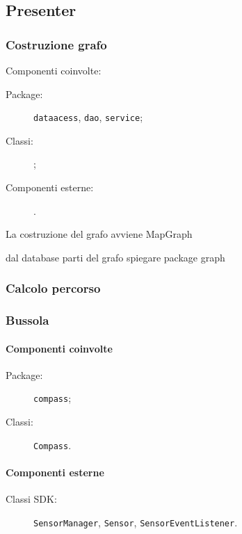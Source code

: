 \documentclass[../ManualeSviluppatore.tex]{subfiles}
\begin{document}
		\subsection{Presenter}
		
		\subsubsection{Costruzione grafo}
		
			Componenti coinvolte:
			\begin{description}
				\item[Package:] \verb|dataacess|, \verb|dao|, \verb|service|;
				\item[Classi:] \verb||;
				\item[Componenti esterne:] .
			\end{description}
			
			La costruzione del grafo avviene 
				MapGraph
				
				
			dal database
			parti del grafo
			spiegare package graph
			
			
		
		\subsubsection{Calcolo percorso}
		
		\subsubsection{Bussola}
		
			\paragraph*{Componenti coinvolte}
			\begin{description}
				\item[Package:] \verb|compass|;
				\item[Classi:] \verb|Compass|.
			\end{description}

			\paragraph*{Componenti esterne}
			\begin{description}
				\item[Classi SDK:] \verb|SensorManager|, \verb|Sensor|, \verb|SensorEventListener|.
			\end{description}
			
\end{document}
